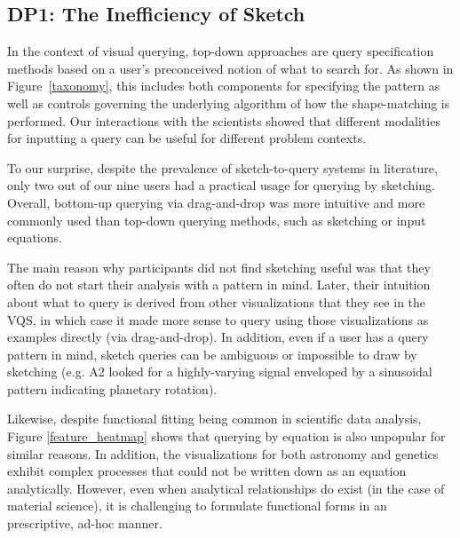 \subsection{DP1: The Inefficiency of Sketch}
\par In the context of visual querying, top-down approaches are query specification methods based on a user's preconceived notion of what to search for. As shown in Figure~\ref{taxonomy}, this includes both components for specifying the pattern as well as controls governing the underlying algorithm of how the shape-matching is performed. Our interactions with the scientists showed that different modalities for inputting a query can be useful for different problem contexts.
\par To our surprise, despite the prevalence of sketch-to-query systems in literature, only two out of our nine users had a practical usage for querying by sketching. Overall, bottom-up querying via drag-and-drop was more intuitive and more commonly used than top-down querying methods, such as sketching or input equations.
\par The main reason why participants did not find sketching useful was that they often do not start their analysis with a pattern in mind. Later, their intuition about what to query is derived from other visualizations that they see in the VQS, in which case it made more sense to query using those visualizations as examples directly (via drag-and-drop). In addition, even if a user has a query pattern in mind, sketch queries can be ambiguous or impossible to draw by sketching (e.g. A2 looked for a highly-varying signal enveloped by a sinusoidal pattern indicating planetary rotation).
\par Likewise, despite functional fitting being common in scientific data analysis, Figure \ref{feature_heatmap} shows that querying by equation is also unpopular for similar reasons. In addition, the visualizations for both astronomy and genetics exhibit complex processes that could not be written down as an equation analytically. However, even when analytical relationships do exist (in the case of material science), it is challenging to formulate functional forms in an prescriptive, ad-hoc manner. 
